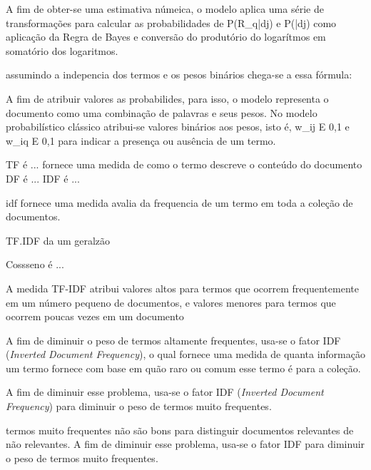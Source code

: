 A fim de obter-se uma estimativa númeica, o modelo aplica uma série de transformações para calcular as probabilidades de P(R_q|dj) e P(|dj) como 
aplicação da Regra de Bayes 
e conversão do produtório do logarítmos em somatório dos logaritmos.




assumindo a indepencia dos termos e os pesos binários chega-se a essa fórmula:



A fim de atribuir valores as probabilides, para isso, o modelo representa o documento como uma combinação de palavras e seus pesos. No modelo probabilístico clássico atribui-se valores binários aos pesos, isto é, w_ij E {0,1} e w_iq E {0,1} para indicar a presença ou ausência de um termo.
















TF é ... fornece uma medida de como o termo descreve o conteúdo do documento
DF é ... 
IDF é ... 

idf fornece uma medida avalia da frequencia de um termo em toda a coleção de documentos.

TF.IDF da um geralzão



Cossseno é ... 


A medida TF-IDF atribui valores altos para termos que ocorrem frequentemente em um número pequeno de documentos, e valores menores para termos que ocorrem poucas vezes em um documento

A fim de diminuir o peso de termos altamente frequentes, usa-se o fator IDF (\textit{Inverted Document Frequency}), o qual fornece uma medida de quanta informação um termo fornece com base em quão raro ou comum esse termo é para a coleção.

A fim de diminuir esse problema, usa-se o fator IDF (\textit{Inverted Document Frequency}) para diminuir o peso de termos muito frequentes. 

termos muito frequentes não são bons para distinguir documentos relevantes de não relevantes. A fim de diminuir esse problema, usa-se o fator IDF para diminuir o peso de termos muito frequentes.




